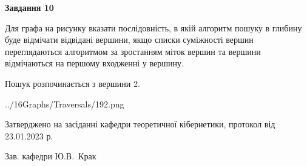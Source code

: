 \documentclass[12pt, ukrainian]{article}
\begin{document}
{\begin {large}
{\begin {center}\textbf{Завдання 10}\end {center}}\par
Для графа на рисунку вказати послідовність, в якій алгоритм пошуку в глибину буде відмічати відвідані вершини, якщо списки суміжності вершин переглядаються алгоритмом за зростанням міток вершин та вершини відмічаються на першому вход\-женні у вершину.\par
Пошук розпочинається з вершини 2.\par

\begin{center}
	{../16Graphs/Traversals/192.png}
\end{center}\par
\newpage


\end {large}
}
{\smallskip \begin {small} Затверджено на засіданні кафедри теоретичної кібернетики, протокол  від   23.01.2023 р.\par\smallskip\smallskip
{\parbox {6.5 cm}{Зав. кафедри \dotfill Ю.В.~Крак}} \end{small}}
\end{document}
